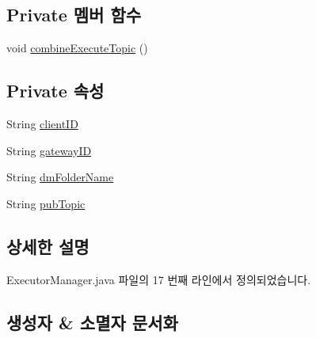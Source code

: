 \subsection*{Private 멤버 함수}
\begin{DoxyCompactItemize}
\item 
void \mbox{\hyperlink{classcom_1_1github_1_1aites_1_1shlocalaites_1_1aitesmanager_1_1_executor_manager_a46bc682fc2a203c32d531db12d664860}{combine\+Execute\+Topic}} ()
\end{DoxyCompactItemize}
\subsection*{Private 속성}
\begin{DoxyCompactItemize}
\item 
String \mbox{\hyperlink{classcom_1_1github_1_1aites_1_1shlocalaites_1_1aitesmanager_1_1_executor_manager_a13e89e7736ea367f5c0d986e92b417c9}{client\+ID}}
\item 
String \mbox{\hyperlink{classcom_1_1github_1_1aites_1_1shlocalaites_1_1aitesmanager_1_1_executor_manager_a709d51cfc2be8075a91702475aa1374f}{gateway\+ID}}
\item 
String \mbox{\hyperlink{classcom_1_1github_1_1aites_1_1shlocalaites_1_1aitesmanager_1_1_executor_manager_a83a9c2334b9cc2cbca87772d2e4cae35}{dm\+Folder\+Name}}
\item 
String \mbox{\hyperlink{classcom_1_1github_1_1aites_1_1shlocalaites_1_1aitesmanager_1_1_executor_manager_aad22e0fb9a135ef6782182ed176d26c1}{pub\+Topic}}
\end{DoxyCompactItemize}


\subsection{상세한 설명}


Executor\+Manager.\+java 파일의 17 번째 라인에서 정의되었습니다.



\subsection{생성자 \& 소멸자 문서화}
\mbox{\label{classcom_1_1github_1_1aites_1_1shlocalaites_1_1aitesmanager_1_1_executor_manager_accd8f9be46aa5f95f80456e5f8a159a6}} 
